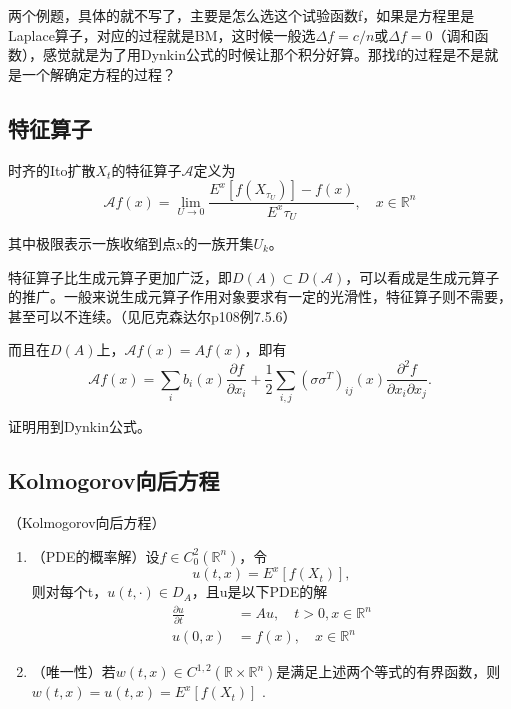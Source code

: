 两个例题，具体的就不写了，主要是怎么选这个试验函数f，如果是方程里是Laplace算子，对应的过程就是BM，这时候一般选$\Delta f = c/n$或$\Delta f = 0$（调和函数），感觉就是为了用Dynkin公式的时候让那个积分好算。那找f的过程是不是就是一个解确定方程的过程？

\subsection{特征算子}

时齐的Ito扩散$X_{t}$的特征算子$\mathcal{A}$定义为
\[
  \mathcal{A} f(x)=\lim_{U \rightarrow 0} \frac{E^{x}\left[f\left(X_{\tau_U}\right)\right]-f(x)}{E^x \tau_U}, \quad x \in \mathbb{R}^{n}
\]

其中极限表示一族收缩到点x的一族开集$U_k$。

特征算子比生成元算子更加广泛，即$D(A) \subset D(\mathcal{A})$，可以看成是生成元算子的推广。一般来说生成元算子作用对象要求有一定的光滑性，特征算子则不需要，甚至可以不连续。（见厄克森达尔p108例7.5.6）

而且在$D(A)$上，$\mathcal{A}f(x) = Af(x)$，即有
\[
  \mathcal{A} f(x)=\sum_{i} b_{i}(x) \frac{\partial f}{\partial x_{i}}+\frac{1}{2} \sum_{i, j}\left(\sigma \sigma^{T}\right)_{i j}(x) \frac{\partial^{2} f}{\partial x_{i} \partial x_{j}} .
\]

证明用到Dynkin公式。

\subsection{Kolmogorov向后方程}

\begin{thm}（Kolmogorov向后方程）
  \begin{enumerate}
    \item （PDE的概率解）设$f \in C_{0}^{2}\left(\mathbb{R}^{n}\right)$，令
    \[
      u(t, x)=E^{x}\left[f\left(X_{t}\right)\right],
    \]
    则对每个t，$u(t, \cdot) \in D_{A}$，且u是以下PDE的解
    \[
      \begin{aligned}
        \frac{\partial u}{\partial t}&=A u, \quad t>0, x \in \mathbb{R}^{n} \\
        u(0, x)&=f(x), \quad x \in \mathbb{R}^{n}
      \end{aligned}
    \]
    \item （唯一性）若$w(t, x) \in C^{1,2}\left(\mathbb{R} \times \mathbb{R}^{n}\right)$是满足上述两个等式的有界函数，则$w(t, x)=u(t, x)=E^{x}\left[f\left(X_{t}\right)\right]$ .
  \end{enumerate}
\end{thm}

